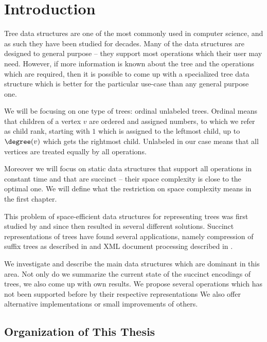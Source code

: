 \chapter*{Introduction}

Tree data structures are one of the most commonly used in computer science, and as such they have been studied for decades.
Many of the data structures are designed to general purpose -- they support most operations which their user may need.
However, if more information is known about the tree and the operations which are required, then it is possible to come up with a specialized tree data structure which is better for the particular use-case than any general purpose one.

We will be focusing on one type of trees: ordinal unlabeled trees.
Ordinal means that children of a vertex $v$ are ordered and assigned numbers, to which we refer as child rank, starting with $1$ which is assigned to the leftmost child, up to $\degree(v)$ which gets the rightmost child.
Unlabeled in our case means that all vertices are treated equally by all operations.

Moreover we will focus on static data structures that support all operations in constant time and that are succinct -- their space complexity is close to the optimal one.
We will define what the restriction on space complexity means in the first chapter.

This problem of space-efficient data structures for representing trees was first studied by \cite{jacobson1989space} and since then resulted in several different solutions.
Succinct representations of trees have found several applications, namely compression of suffix trees as described in \cite{jansson2012ultra} and XML document processing described in \cite{geary2006succinct}.

We investigate and describe the main data structures which are dominant in this area.
Not only do we summarize the current state of the succinct encodings of trees, we also come up with own results.
We propose several operations which has not been supported before by their respective representations
We also offer alternative implementations or small improvements of others.

\section*{Organization of This Thesis}

